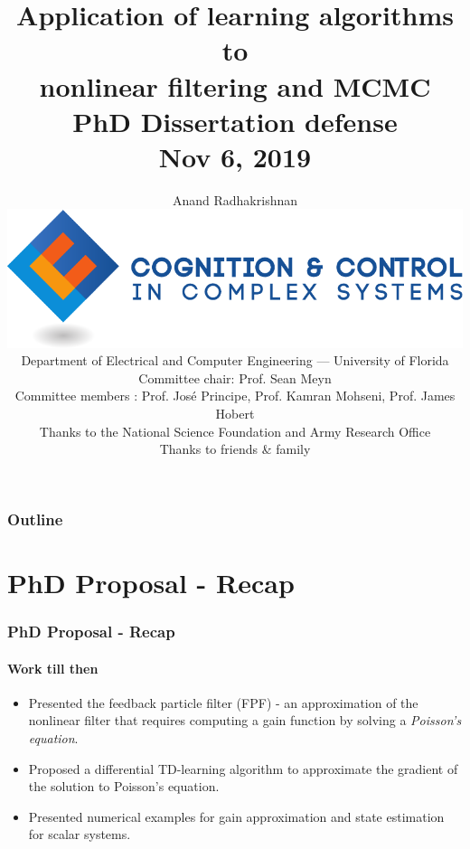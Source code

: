 \documentclass[xcolor=dvipsnames, subsection=false]{beamer}
\def\alertb#1{\alert{\color{BrickRed}  #1}}
\def\alertc#1{\alert{\color{MyDarkBlue}  #1}}
\def\alertb#1{\alert{\color{BrickRed}  #1}}
\def\alertc#1{\alert{\color{MyDarkBlue}  #1}}
\begin{document}
\thispagestyle{empty}
\setcounter{page}{0}



\title{\Large
	\textbf{Application of learning algorithms to
		\\
		nonlinear filtering and MCMC}
	\\[.5em]
	\normalsize
	PhD Dissertation defense
	\\[.5em]
	\scriptsize
	Nov 6, 2019}

\author{
	\small Anand Radhakrishnan
	\\[.2cm]
	\href{http://ccc.centers.ufl.edu/}{\includegraphics[width=.2\hsize]{c3logocmyk.pdf}}
	\\[.2cm]
	\small
	\scriptsize
	Department of Electrical and Computer Engineering
	---
	University of Florida
	\\[.3cm]\color{Sepia}
	\scriptsize
	Committee chair: \alertc{Prof. Sean Meyn}
	\\[.25cm]
	Committee members : \alertc{Prof. Jos\'{e} Principe, Prof. Kamran Mohseni, Prof. James Hobert}
	\\[.25cm]
	\scriptsize \color{Sepia} 
	Thanks to the National Science Foundation and Army Research Office \\
   \scriptsize \color{Sepia}
   Thanks to friends \& family}
\date{}

\frame{\titlepage}

\begin{frame}
  \thispagestyle{empty}
  \setcounter{framenumber}{0}

  \frametitle{Outline}
  \framesubtitle{}
  \tableofcontents
\end{frame}

\section{PhD Proposal - Recap}
\begin{frame}
\frametitle{PhD Proposal - Recap}
\framesubtitle{Work till then}
\begin{itemize}
	\item Presented the \alertb{feedback particle filter (FPF)} - an approximation of the nonlinear filter that requires computing a gain function by solving a \textit{Poisson's equation}. 
	\item Proposed a \alertb{differential TD-learning} algorithm to approximate the gradient of the solution to Poisson's equation. \pause
	\item Presented numerical examples for gain approximation and state estimation for scalar systems.
\end{itemize}
\end{frame}
\end{document}
